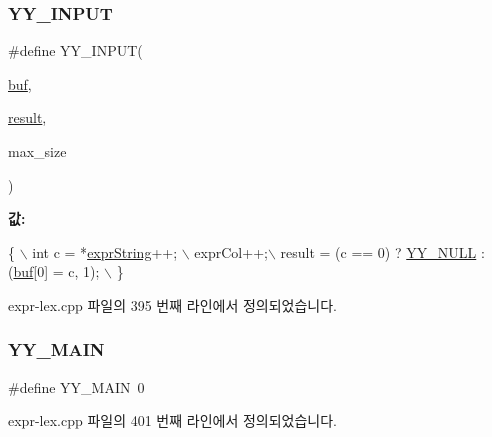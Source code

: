 \mbox{\label{expr-lex_8cpp_aacfdca45fa4beb8b06172525a53c424a}} 
\subsubsection{\texorpdfstring{Y\+Y\+\_\+\+I\+N\+P\+UT}{YY\_INPUT}}
{\footnotesize\ttfamily \#define Y\+Y\+\_\+\+I\+N\+P\+UT(\begin{DoxyParamCaption}\item[{}]{\mbox{\hyperlink{expr-lex_8cpp_aaaf5379ca5750ed4ef26a247cca0103c}{buf}},  }\item[{}]{\mbox{\hyperlink{expr_8cpp_a8ad9a782076057c9c0a54c3a233468d4}{result}},  }\item[{}]{max\+\_\+size }\end{DoxyParamCaption})}

{\bfseries 값\+:}
\begin{DoxyCode}
\{ \(\backslash\)
    int c = *\mbox{\hyperlink{expr-lex_8cpp_aa1f704d92ffa441305e3434381d676f7}{exprString}}++; \(\backslash\)
    exprCol++;\(\backslash\)
    result = (c == 0) ? \mbox{\hyperlink{expr-lex_8cpp_a8e0bcf8f8a5b613ea583347f8bc31cbf}{YY\_NULL}} : (\mbox{\hyperlink{expr-lex_8cpp_aaaf5379ca5750ed4ef26a247cca0103c}{buf}}[0] = c, 1); \(\backslash\)
    \}
\end{DoxyCode}


expr-\/lex.\+cpp 파일의 395 번째 라인에서 정의되었습니다.

\mbox{\label{expr-lex_8cpp_a4c49735b8f960c5801812993b6f787b7}} 
\subsubsection{\texorpdfstring{Y\+Y\+\_\+\+M\+A\+IN}{YY\_MAIN}}
{\footnotesize\ttfamily \#define Y\+Y\+\_\+\+M\+A\+IN~0}



expr-\/lex.\+cpp 파일의 401 번째 라인에서 정의되었습니다.

\mbox{\label{expr-lex_8cpp_a68792d73820bc46a71d3d4e613f0b977}} 
